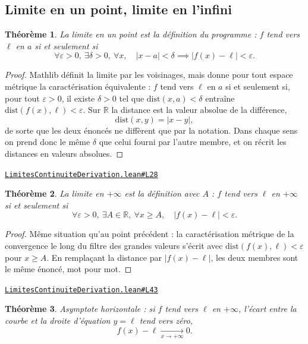 \documentclass[11pt,a4paper]{article}
\theoremstyle{definition}
\theoremstyle{plain}
\newtheorem{theoreme}{Théorème}
\newcommand{\source}[2]{\par\smallskip\noindent\hfill{\footnotesize\href{#1}{\texttt{#2}}}\par\smallskip}
\begin{document}
\subsection{Limite en un point, limite en l'infini}

\begin{theoreme}
La limite en un point est la définition du programme : $f$ tend vers $\ell$ en $a$ si et
seulement si
\[ \forall \varepsilon > 0,\ \exists \delta > 0,\ \forall x,\quad
   |x - a| < \delta \implies |f(x) - \ell| < \varepsilon . \]
\end{theoreme}

\begin{proof}
Mathlib définit la limite par les voisinages, mais donne pour tout espace métrique la
caractérisation équivalente : $f$ tend vers $\ell$ en $a$ si et seulement si, pour tout
$\varepsilon > 0$, il existe $\delta > 0$ tel que $\mathrm{dist}(x, a) < \delta$ entraîne
$\mathrm{dist}(f(x), \ell) < \varepsilon$. Sur $\mathbb{R}$ la distance est la valeur
absolue de la différence,
\[ \mathrm{dist}(x, y) = |x - y| , \]
de sorte que les deux énoncés ne diffèrent que par la notation. Dans chaque sens on prend
donc le même $\delta$ que celui fourni par l'autre membre, et on récrit les distances en
valeurs absolues.
\end{proof}
\source{https://github.com/Commutator-IO/learn-lean/blob/main/cours/02-lycee/04-limites-continuite-derivation/LimitesContinuiteDerivation.lean\#L28}{LimitesContinuiteDerivation.lean\#L28}

\begin{theoreme}
La limite en $+\infty$ est la définition avec $A$ : $f$ tend vers $\ell$ en $+\infty$ si
et seulement si
\[ \forall \varepsilon > 0,\ \exists A \in \mathbb{R},\ \forall x \ge A,\quad
   |f(x) - \ell| < \varepsilon . \]
\end{theoreme}

\begin{proof}
Même situation qu'au point précédent : la caractérisation métrique de la convergence le
long du filtre des grandes valeurs s'écrit avec $\mathrm{dist}(f(x), \ell) < \varepsilon$
pour $x \ge A$. En remplaçant la distance par $|f(x) - \ell|$, les deux membres sont le
même énoncé, mot pour mot.
\end{proof}
\source{https://github.com/Commutator-IO/learn-lean/blob/main/cours/02-lycee/04-limites-continuite-derivation/LimitesContinuiteDerivation.lean\#L43}{LimitesContinuiteDerivation.lean\#L43}

\begin{theoreme}
Asymptote horizontale : si $f$ tend vers $\ell$ en $+\infty$, l'écart entre la courbe et
la droite d'équation $y = \ell$ tend vers zéro,
\[ f(x) - \ell \xrightarrow[x \to +\infty]{} 0 . \]
\end{theoreme}
\end{document}
